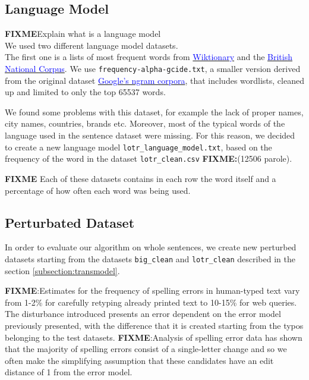 \subsection{Language Model}
\textbf{FIXME}{Explain what is a language model}\\
We used two different language model datasets. \\
The first one is a lists of most frequent words from \href{https://en.wiktionary.org/wiki/Wiktionary:Frequency_lists}{ 
\textcolor{blue}{Wiktionary}} and the \href{http://www.kilgarriff.co.uk/bnc-readme.html}{\textcolor{blue}{British National 
Corpus}}. 
We use \texttt{frequency-alpha-gcide.txt}, a smaller version derived from the original dataset 
\href{https://books.google.com/ngrams/}{\textcolor{blue}{Google's ngram corpora}}, that includes wordlists, cleaned up 
and limited to only the top \num{65537} words.

We found some problems with this dataset, for example the lack of proper names, city names, countries, brands etc.
Moreover, most of the typical words of the language used in the sentence dataset were missing.
For this reason, we decided to create a new language model \texttt{lotr\_language\_model.txt}, based on the frequency of 
the word in the dataset \texttt{lotr\_clean.csv} \textbf{FIXME:}(12506 parole).

 \textbf{FIXME}{
Each of these datasets contains in each row the word itself and a percentage of how often each word was being used.}

\subsection{Perturbated Dataset}
\label{subsection:perturbed}
In order to evaluate our algorithm on whole sentences, we create new perturbed datasets starting from the datasets 
\texttt{big\_clean} and \texttt{lotr\_clean} described in the section \ref{subsection:transmodel}.

\textbf{FIXME}:Estimates for the frequency of spelling errors in human-typed text vary from 1-2\% for carefully retyping 
already printed text to 10-15\% for web queries.
The disturbance introduced presents an error dependent on the error model previously presented, with the 
difference that it is created starting from the typos belonging to the test datasets.
\textbf{FIXME}:{Analysis of spelling error data has shown that the majority of spelling errors consist of a single-letter 
change and 
	so we often make the simplifying assumption that these candidates have an edit distance of 1 from the error 
	model.}

